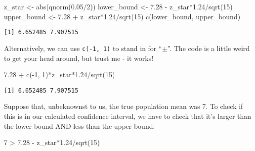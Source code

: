 \documentclass[
  letterpaper,
  DIV=11,
  numbers=noendperiod]{scrreprt}
\newenvironment{Shaded}{\begin{snugshade}}{\end{snugshade}}
\newcommand{\DecValTok}[1]{\textcolor[rgb]{0.68,0.00,0.00}{#1}}
\newcommand{\FloatTok}[1]{\textcolor[rgb]{0.68,0.00,0.00}{#1}}
\newcommand{\FunctionTok}[1]{\textcolor[rgb]{0.28,0.35,0.67}{#1}}
\newcommand{\NormalTok}[1]{\textcolor[rgb]{0.00,0.23,0.31}{#1}}
\newcommand{\OtherTok}[1]{\textcolor[rgb]{0.00,0.23,0.31}{#1}}
\newcommand{\SpecialCharTok}[1]{\textcolor[rgb]{0.37,0.37,0.37}{#1}}
\begin{document}
\begin{Shaded}
\begin{Highlighting}[]
\NormalTok{z\_star }\OtherTok{\textless{}{-}} \FunctionTok{abs}\NormalTok{(}\FunctionTok{qnorm}\NormalTok{(}\FloatTok{0.05}\SpecialCharTok{/}\DecValTok{2}\NormalTok{))}
\NormalTok{lower\_bound }\OtherTok{\textless{}{-}} \FloatTok{7.28} \SpecialCharTok{{-}}\NormalTok{ z\_star}\SpecialCharTok{*}\FloatTok{1.24}\SpecialCharTok{/}\FunctionTok{sqrt}\NormalTok{(}\DecValTok{15}\NormalTok{)}
\NormalTok{upper\_bound }\OtherTok{\textless{}{-}} \FloatTok{7.28} \SpecialCharTok{+}\NormalTok{ z\_star}\SpecialCharTok{*}\FloatTok{1.24}\SpecialCharTok{/}\FunctionTok{sqrt}\NormalTok{(}\DecValTok{15}\NormalTok{)}
\FunctionTok{c}\NormalTok{(lower\_bound, upper\_bound)}
\end{Highlighting}
\end{Shaded}

\begin{verbatim}
[1] 6.652485 7.907515
\end{verbatim}

Alternatively, we can use \texttt{c(-1,\ 1)} to stand in for
``\(\pm\)''. The code is a little weird to get your head around, but
trust me - it works!

\begin{Shaded}
\begin{Highlighting}[]
\FloatTok{7.28} \SpecialCharTok{+} \FunctionTok{c}\NormalTok{(}\SpecialCharTok{{-}}\DecValTok{1}\NormalTok{, }\DecValTok{1}\NormalTok{)}\SpecialCharTok{*}\NormalTok{z\_star}\SpecialCharTok{*}\FloatTok{1.24}\SpecialCharTok{/}\FunctionTok{sqrt}\NormalTok{(}\DecValTok{15}\NormalTok{)}
\end{Highlighting}
\end{Shaded}

\begin{verbatim}
[1] 6.652485 7.907515
\end{verbatim}

Suppose that, unbeknownst to us, the true population mean was 7. To
check if this is in our calculated confidence interval, we have to check
that it's larger than the lower bound AND less than the upper bound:

\begin{Shaded}
\begin{Highlighting}[]
\DecValTok{7} \SpecialCharTok{\textgreater{}} \FloatTok{7.28} \SpecialCharTok{{-}}\NormalTok{ z\_star}\SpecialCharTok{*}\FloatTok{1.24}\SpecialCharTok{/}\FunctionTok{sqrt}\NormalTok{(}\DecValTok{15}\NormalTok{) }
\end{Highlighting}
\end{Shaded}
\end{document}
